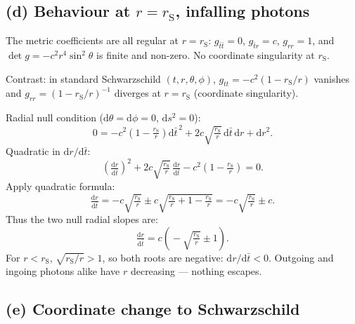 \documentclass[11pt]{article}
\newcommand{\de}{\mathrm{d}}
\newcommand{\rs}{r_{\mathrm{S}}}
\begin{document}
\subsection*{(d) Behaviour at $r=\rs$, infalling photons}

The metric coefficients are all regular at $r=\rs$: $g_{\bar t\bar t}=0$, $g_{\bar t r}=c$, $g_{rr}=1$, and $\det g = -c^2 r^4 \sin^2\theta$ is finite and non-zero. No coordinate singularity at $\rs$.

Contrast: in standard Schwarzschild $(t,r,\theta,\phi)$, $g_{tt}=-c^2(1-\rs/r)$ vanishes and $g_{rr}=(1-\rs/r)^{-1}$ diverges at $r=\rs$ (coordinate singularity).

Radial null condition ($\de\theta=\de\phi=0$, $\de s^2=0$):
\[
0 = -c^2\!\left(1-\tfrac{\rs}{r}\right)\!\de\bar t^{\,2} + 2c\sqrt{\tfrac{\rs}{r}}\,\de\bar t\,\de r + \de r^2.
\]
Quadratic in $\de r/\de\bar t$:
\[
\!\left(\tfrac{\de r}{\de\bar t}\right)^{\!2} + 2c\sqrt{\tfrac{\rs}{r}}\,\tfrac{\de r}{\de\bar t} - c^2\!\left(1-\tfrac{\rs}{r}\right) = 0.
\]
Apply quadratic formula:
\[
\tfrac{\de r}{\de\bar t} = -c\sqrt{\tfrac{\rs}{r}} \pm c\sqrt{\tfrac{\rs}{r} + 1 - \tfrac{\rs}{r}} = -c\sqrt{\tfrac{\rs}{r}} \pm c.
\]
Thus the two null radial slopes are:
\[
\boxed{\;\tfrac{\de r}{\de\bar t} = c\!\left(\!-\sqrt{\tfrac{\rs}{r}} \pm 1\right).\;}
\]
For $r<\rs$, $\sqrt{\rs/r}>1$, so both roots are negative: $\de r/\de\bar t<0$. Outgoing and ingoing photons alike have $r$ decreasing --- nothing escapes.

\subsection*{(e) Coordinate change to Schwarzschild}
\end{document}
